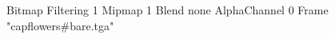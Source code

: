 {Bitmap
	{Filtering 1}
	{Mipmap 1}
	{Blend none}
	{AlphaChannel 0}
	{Frame "capflowers#bare.tga"}
}
